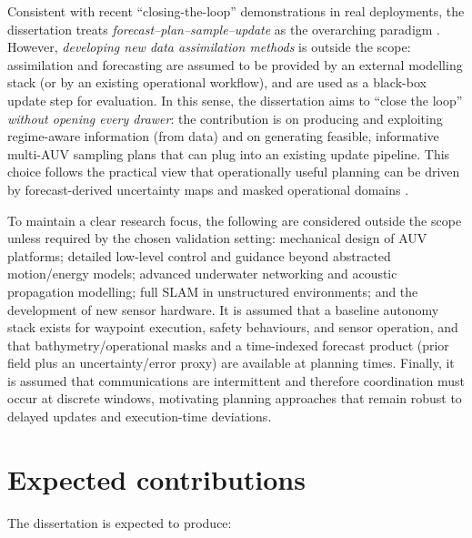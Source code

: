 Consistent with recent ``closing-the-loop'' demonstrations in real deployments, the dissertation treats \emph{forecast–plan–sample–update} as the overarching paradigm \cite{bernacchi2025closingloop}. However, \emph{developing new data assimilation methods} is outside the scope: assimilation and forecasting are assumed to be provided by an external modelling stack (or by an existing operational workflow), and are used as a black-box update step for evaluation. In this sense, the dissertation aims to ``close the loop'' \emph{without opening every drawer}: the contribution is on producing and exploiting regime-aware information (from data) and on generating feasible, informative multi-AUV sampling plans that can plug into an existing update pipeline. This choice follows the practical view that operationally useful planning can be driven by forecast-derived uncertainty maps and masked operational domains \cite{duarte2025geostatistical}.

To maintain a clear research focus, the following are considered outside the scope unless required by the chosen validation setting: mechanical design of AUV platforms; detailed low-level control and guidance beyond abstracted motion/energy models; advanced underwater networking and acoustic propagation modelling; full SLAM in unstructured environments; and the development of new sensor hardware. It is assumed that a baseline autonomy stack exists for waypoint execution, safety behaviours, and sensor operation, and that bathymetry/operational masks and a time-indexed forecast product (prior field plus an uncertainty/error proxy) are available at planning times. Finally, it is assumed that communications are intermittent and therefore coordination must occur at discrete windows, motivating planning approaches that remain robust to delayed updates and execution-time deviations.


\section{Expected contributions} \label{sec:expected_contributions}

The dissertation is expected to produce:

